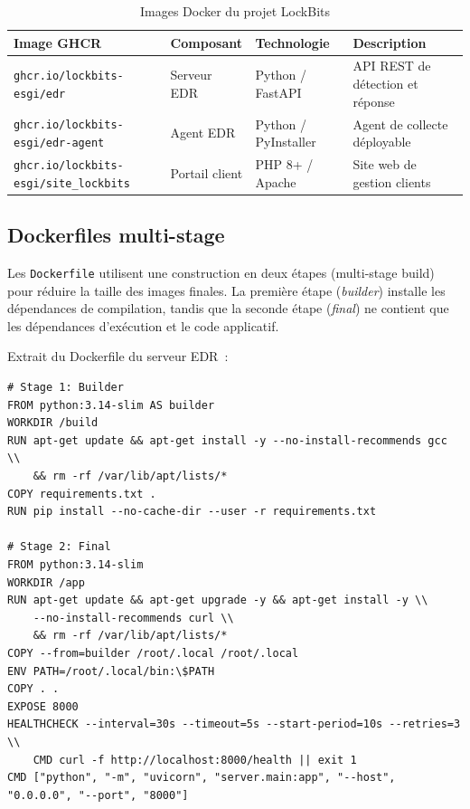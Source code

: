 \begin{table}[H]
\centering
\caption{Images Docker du projet LockBits}
\label{tab:images-docker}
\begin{tabularx}{\textwidth}{l l l X}
\toprule
\textbf{Image GHCR} & \textbf{Composant} & \textbf{Technologie} & \textbf{Description} \\
\midrule
\texttt{ghcr.io/lockbits-esgi/edr} & Serveur EDR & Python / FastAPI & API REST de détection et réponse \\
\texttt{ghcr.io/lockbits-esgi/edr-agent} & Agent EDR & Python / PyInstaller & Agent de collecte déployable \\
\texttt{ghcr.io/lockbits-esgi/site\_lockbits} & Portail client & PHP 8+ / Apache & Site web de gestion clients \\
\bottomrule
\end{tabularx}
\end{table}

\subsection{Dockerfiles multi-stage}

Les \texttt{Dockerfile} utilisent une construction en deux étapes (multi-stage
build) pour réduire la taille des images finales. La première étape (\emph{builder})
installe les dépendances de compilation, tandis que la seconde étape (\emph{final})
ne contient que les dépendances d'exécution et le code applicatif.

Extrait du Dockerfile du serveur EDR~:

\begin{lstlisting}[language=dockerbash, caption={Dockerfile multi-stage du serveur EDR}, label={lst:dockerfile-edr}]
# Stage 1: Builder
FROM python:3.14-slim AS builder
WORKDIR /build
RUN apt-get update && apt-get install -y --no-install-recommends gcc \\
    && rm -rf /var/lib/apt/lists/*
COPY requirements.txt .
RUN pip install --no-cache-dir --user -r requirements.txt

# Stage 2: Final
FROM python:3.14-slim
WORKDIR /app
RUN apt-get update && apt-get upgrade -y && apt-get install -y \\
    --no-install-recommends curl \\
    && rm -rf /var/lib/apt/lists/*
COPY --from=builder /root/.local /root/.local
ENV PATH=/root/.local/bin:\$PATH
COPY . .
EXPOSE 8000
HEALTHCHECK --interval=30s --timeout=5s --start-period=10s --retries=3 \\
    CMD curl -f http://localhost:8000/health || exit 1
CMD ["python", "-m", "uvicorn", "server.main:app", "--host", "0.0.0.0", "--port", "8000"]
\end{lstlisting}

